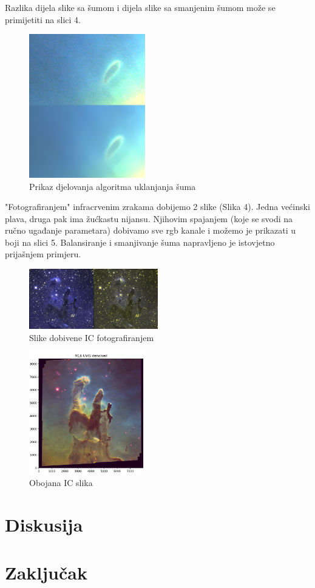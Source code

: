 \documentclass[conference]{IEEEtran}
\begin{document}
Razlika dijela slike sa šumom i dijela slike sa smanjenim šumom može se primijetiti na slici 4.
\begin{figure}[h]
    \centering
    \includegraphics[width=0.45\textwidth]{noise_denoised}
    \caption{Prikaz djelovanja algoritma uklanjanja šuma}
    \label{slika:s4}
\end{figure}


"Fotografiranjem" infracrvenim zrakama dobijemo 2 slike (Slika 4). Jedna većinski plava, druga pak ima žućkastu nijansu. Njihovim spajanjem (koje se svodi na ručno ugađanje parametara) dobivamo sve rgb kanale i možemo je prikazati u boji na slici 5. Balansiranje i smanjivanje šuma napravljeno je istovjetno prijašnjem primjeru.
\begin{figure}[h]
    \centering
    \includegraphics[width=0.5\textwidth]{IC_kanali}
    \caption{Slike dobivene IC fotografiranjem}
    \label{slika:s5}
\end{figure}
\begin{figure}[h]
    \centering
    \includegraphics[width=0.45\textwidth]{IC_colorized}
    \caption{Obojana IC slika}
    \label{slika:s5}
\end{figure}

\section{Diskusija}

\section{Zaključak}

\listoffigures


\vspace{12pt}
\end{document}
